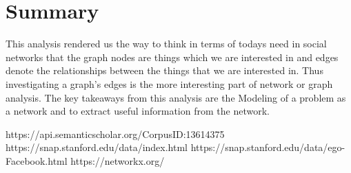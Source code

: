 \documentclass{article}
\begin{document}
\section{Summary}
This analysis rendered us the way to think in terms of todays need in social networks that the graph nodes are things which we are interested in and edges denote the relationships between the things that we are interested in. Thus investigating a graph's edges is the more interesting part of network or graph analysis.
\newline
The key takeaways from this analysis are the Modeling of a problem as a network and to extract useful information from the network.



https://api.semanticscholar.org/CorpusID:13614375
\newline
https://snap.stanford.edu/data/index.html
\newline
https://snap.stanford.edu/data/ego-Facebook.html
\newline
https://networkx.org/
\end{document}
